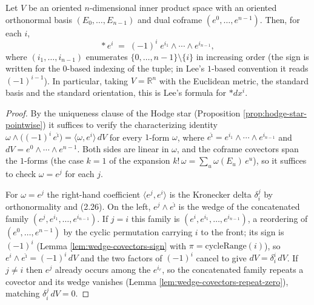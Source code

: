 \begin{proposition}
\label{prop:hodge-star-euclidean-single}
\leanok
{}
Let $V$ be an oriented $n$-dimensional inner product space with an oriented orthonormal basis $(E_0, \ldots, E_{n-1})$ and dual coframe $(e^0, \ldots, e^{n-1})$. Then, for each $i$,
\[
{*}\, e^i \;=\; (-1)^{i}\; e^{i_1} \wedge \cdots \wedge e^{i_{n-1}},
\]
where $(i_1, \ldots, i_{n-1})$ enumerates $\{0, \ldots, n-1\} \setminus \{i\}$ in increasing order (the sign is written for the $0$-based indexing of the tuple; in Lee's $1$-based convention it reads $(-1)^{i-1}$). In particular, taking $V = \mathbb{R}^n$ with the Euclidean metric, the standard basis and the standard orientation, this is Lee's formula for $* dx^i$.
\end{proposition}
\begin{proof}
\leanok
{}
By the uniqueness clause of the Hodge star (Proposition \ref{prop:hodge-star-pointwise}) it suffices to verify the characterizing identity $\omega \wedge \big((-1)^i\, e^{\hat\imath}\big) = \langle \omega, e^i\rangle\, dV$ for every $1$-form $\omega$, where $e^{\hat\imath} = e^{i_1} \wedge \cdots \wedge e^{i_{n-1}}$ and $dV = e^0 \wedge \cdots \wedge e^{n-1}$. Both sides are linear in $\omega$, and the coframe covectors span the $1$-forms (the case $k=1$ of the expansion $k!\,\omega = \sum_u \omega(E_{u}) \, e^{u}$), so it suffices to check $\omega = e^j$ for each $j$.

For $\omega = e^j$ the right-hand coefficient $\langle e^j, e^i\rangle$ is the Kronecker delta $\delta^j_i$ by orthonormality and (2.26). On the left, $e^j \wedge e^{\hat\imath}$ is the wedge of the concatenated family $(e^j, e^{i_1}, \ldots, e^{i_{n-1}})$. If $j = i$ this family is $(e^i, e^{i_1}, \ldots, e^{i_{n-1}})$, a reordering of $(e^0, \ldots, e^{n-1})$ by the cyclic permutation carrying $i$ to the front; its sign is $(-1)^{i}$ (Lemma \ref{lem:wedge-covectors-sign} with $\pi = \mathrm{cycleRange}(i)$), so $e^i \wedge e^{\hat\imath} = (-1)^i\, dV$ and the two factors of $(-1)^i$ cancel to give $dV = \delta^i_i\, dV$. If $j \neq i$ then $e^j$ already occurs among the $e^{i_r}$, so the concatenated family repeats a covector and its wedge vanishes (Lemma \ref{lem:wedge-covectors-repeat-zero}), matching $\delta^j_i\, dV = 0$.
\end{proof}

